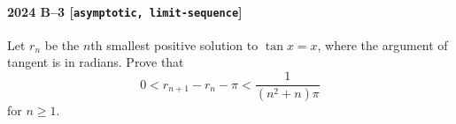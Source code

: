 \paragraph{2024 B--3 \textnormal{[\texttt{asymptotic, limit-sequence}]}}
Let $r_n$ be the $n$th smallest positive solution to $\tan x = x$, where the argument of tangent is in radians. Prove that
\[
0 < r_{n+1} - r_n - \pi < \frac{1}{(n^2+n)\pi}
\]
for $n \geq 1$.
